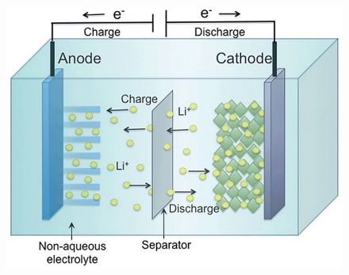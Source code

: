 \begin{figure}[label={fig:liakkuaufbau}, caption={Aufbau eines Lithium-Akkumulators \cite{LyncPicLi}}]
    \includegraphics[scale=0.6]{figures/mceclip0_1642665078.png}
\end{figure}
